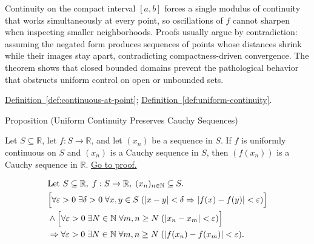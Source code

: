 \begin{remark*}[Interpretation]
Continuity on the compact interval $[a,b]$ forces a single modulus of continuity that works simultaneously at every point, so oscillations of $f$ cannot sharpen when inspecting smaller neighborhoods. Proofs usually argue by contradiction: assuming the negated form produces sequences of points whose distances shrink while their images stay apart, contradicting compactness-driven convergence. The theorem shows that closed bounded domains prevent the pathological behavior that obstructs uniform control on open or unbounded sets.
\end{remark*}

\begin{dependencies}
\hyperref[def:continuous-at-point]{Definition~\ref*{def:continuous-at-point}};\;
\hyperref[def:uniform-continuity]{Definition~\ref*{def:uniform-continuity}}.
\end{dependencies}


\begin{propositionbox}{Proposition (Uniform Continuity Preserves Cauchy Sequences)}
\begin{proposition}
\label{prop:uniform-continuity-cauchy}
Let $S \subseteq \mathbb{R}$, let $f:S \to \mathbb{R}$, and let $(x_n)$ be a sequence in $S$. If $f$ is uniformly continuous on $S$ and $(x_n)$ is a Cauchy sequence in $S$, then $(f(x_n))$ is a Cauchy sequence in $\mathbb{R}$.
\hyperref[prf:uniform-continuity-cauchy]{Go to proof.}
\end{proposition}
\end{propositionbox}

\begin{remark*}
\[
\begin{aligned}
&\text{Let } S \subseteq \mathbb{R},\; f:S \to \mathbb{R},\; (x_n)_{n\in\mathbb{N}}\subseteq S.\\
&\Bigl[\forall \varepsilon>0\;\exists \delta>0\;\forall x,y \in S\;( |x-y|<\delta \Rightarrow |f(x)-f(y)|<\varepsilon )\Bigr]\\
&\land \Bigl[\forall \varepsilon>0\;\exists N \in \mathbb{N}\;\forall m,n \ge N\;( |x_n - x_m|<\varepsilon )\Bigr]\\
&\Rightarrow \forall \varepsilon>0\;\exists N \in \mathbb{N}\;\forall m,n \ge N\;( |f(x_n) - f(x_m)|<\varepsilon ).
\end{aligned}
\]
\end{remark*}


